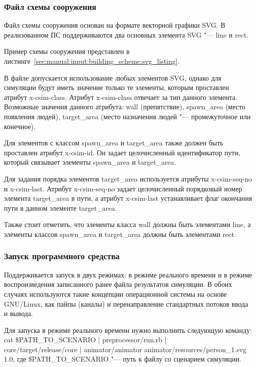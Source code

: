\subsubsection{Файл схемы сооружения}
\label{sec:manual:input:building_scheme}

Файл схемы сооружения основан на формате векторной графики SVG.
В реализованном ПС поддерживаются два основных элемента SVG "--- line и rect.

Пример схемы сооружения представлен в листинге~\ref{sec:manual:input:building_scheme:svg_listing}.



В файле допускается использование любых элементов SVG, однако для симуляции будут иметь значение только те элементы, которым проставлен атрибут x-csim-class.
Атрибут x-csim-class отвечает за тип данного элемента.  Возможные значения данного атрибута:
  wall (препятствие),
  spawn\_area (место появления людей),
  target\_area (место назначения людей "--- промежуточное или конечное).

Для элементов с классом spawn\_area и target\_area также должен быть проставлен атрибут x-csim-id.
Он задает целочисленный идентификатор пути, который связывает элементы spawn\_area и target\_area.

Для задания порядка элементов target\_area используется атрибуты x-csim-seq-no и x-csim-last.
Атрибут x-csim-seq-no задает целочисленный порядковый номер элемента target\_area в пути,
а атрибут x-csim-last устанавливает флаг окончания пути в данном элементе target\_area.

Также стоит отметить, что элементы класса wall должны быть элементами line,
а элементы классов spawn\_area и target\_area должны быть элементами rect.

\subsubsection{Запуск программного средства}
\label{sec:manual:input:launch}

Поддерживается запуск в двух режимах: в режиме реального времени и в режиме воспроизведения записанного ранее файла результатов симуляции.
В обоих случаях используются такие концепции операционной системы на основе GNU/Linux, как пайпы (каналы) и перенаправление стандартных потоков ввода и вывода.

Для запуска в режиме реального времени нужно выполнить следующую команду:
cat \$PATH\_TO\_SCENARIO \-|\- preprocessor/run.rb \-|\- \\ core/target/release/core \-|\- animator/animator animator/resources/person\_1.svg 1.0,
где \$PATH\_TO\_SCENARIO "--- путь к файлу со сценарием симуляции.

